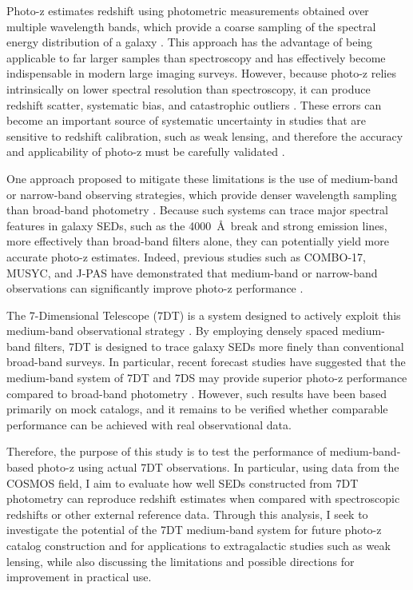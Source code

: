 \documentclass[11pt]{article}
\let\cite\citep
\begin{document}
Photo-z estimates redshift using photometric measurements obtained over multiple wavelength bands, which provide a coarse sampling of the spectral energy distribution of a galaxy \cite{Salvato2019}. This approach has the advantage of being applicable to far larger samples than spectroscopy and has effectively become indispensable in modern large imaging surveys. However, because photo-z relies intrinsically on lower spectral resolution than spectroscopy, it can produce redshift scatter, systematic bias, and catastrophic outliers \cite{Salvato2019,Dahlen2013}. These errors can become an important source of systematic uncertainty in studies that are sensitive to redshift calibration, such as weak lensing, and therefore the accuracy and applicability of photo-z must be carefully validated \cite{Huterer2013,LSSTDESC2018}.

One approach proposed to mitigate these limitations is the use of medium-band or narrow-band observing strategies, which provide denser wavelength sampling than broad-band photometry \cite{Wolf2003,Cardamone2010,Benitez2014}. Because such systems can trace major spectral features in galaxy SEDs, such as the 4000~\AA\ break and strong emission lines, more effectively than broad-band filters alone, they can potentially yield more accurate photo-z estimates. Indeed, previous studies such as COMBO-17, MUSYC, and J-PAS have demonstrated that medium-band or narrow-band observations can significantly improve photo-z performance \cite{Wolf2003,Cardamone2010,HernanCaballero2021}.

The 7-Dimensional Telescope (7DT) is a system designed to actively exploit this medium-band observational strategy \cite{Ko2025}. By employing densely spaced medium-band filters, 7DT is designed to trace galaxy SEDs more finely than conventional broad-band surveys. In particular, recent forecast studies have suggested that the medium-band system of 7DT and 7DS may provide superior photo-z performance compared to broad-band photometry \cite{Ko2025}. However, such results have been based primarily on mock catalogs, and it remains to be verified whether comparable performance can be achieved with real observational data.

Therefore, the purpose of this study is to test the performance of medium-band-based photo-z using actual 7DT observations. In particular, using data from the COSMOS field, I aim to evaluate how well SEDs constructed from 7DT photometry can reproduce redshift estimates when compared with spectroscopic redshifts or other external reference data. Through this analysis, I seek to investigate the potential of the 7DT medium-band system for future photo-z catalog construction and for applications to extragalactic studies such as weak lensing, while also discussing the limitations and possible directions for improvement in practical use.
\end{document}
